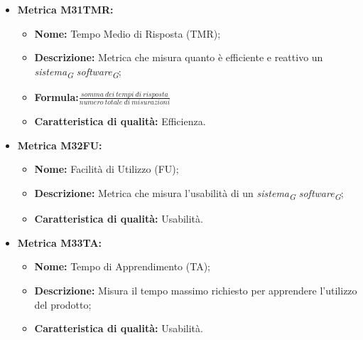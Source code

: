 \begin{itemize}
            \item \hypertarget{item:M31TMR}{\textbf{Metrica M31TMR:}}
            \begin{minipage}[t]{0.9\textwidth}
                  \begin{itemize}
                      \item \textbf{Nome:} Tempo Medio di Risposta (TMR);
                      \item \textbf{Descrizione:} Metrica che misura quanto è efficiente e reattivo un \textit{sistema}\textsubscript{\textit{G}} \textit{software}\textsubscript{\textit{G}};
                      \item \textbf{Formula:}$\frac{somma \ dei \ tempi \ di \ risposta}{numero \ totale \ di \ misurazioni}$
                      \item \textbf{Caratteristica di qualità:} Efficienza.
                    \end{itemize}
                \end{minipage}  


            \item \hypertarget{item:M32FU}{\textbf{Metrica M32FU:}}
            \begin{minipage}[t]{0.9\textwidth}
                  \begin{itemize}
                      \item \textbf{Nome:} Facilità di Utilizzo (FU);
                      \item \textbf{Descrizione:} Metrica che misura l'usabilità di un \textit{sistema}\textsubscript{\textit{G}} \textit{software}\textsubscript{\textit{G}};
                      \item \textbf{Caratteristica di qualità:} Usabilità.
                    \end{itemize}
                \end{minipage}

            \item \hypertarget{item:M33TA}{\textbf{Metrica M33TA:}}
            \begin{minipage}[t]{0.9\textwidth}
                  \begin{itemize}
                      \item \textbf{Nome:} Tempo di Apprendimento (TA);
                      \item \textbf{Descrizione:} Misura il tempo massimo richiesto per apprendere l'utilizzo del prodotto;
                      \item \textbf{Caratteristica di qualità:} Usabilità.
                    \end{itemize}
                \end{minipage}


\end{itemize}
